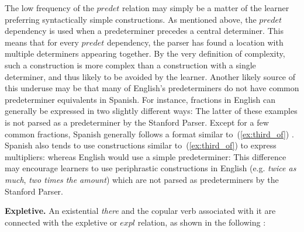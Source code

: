 \documentclass[main.tex]{subfiles}
\begin{document}
The low frequency of the $predet$ relation may simply be a matter of the learner preferring syntactically simple constructions. As mentioned above, the $predet$ dependency is used when a predeterminer precedes a central determiner. This means that for every $predet$ dependency, the parser has found a location with multiple determiners appearing together. By the very definition of complexity, such a construction is more complex than a construction with a single determiner, and thus likely to be avoided by the learner. Another likely source of this underuse may be that many of English's predeterminers do not have common predeterminer equivalents in Spanish. For instance, fractions in English can generally be expressed in two slightly different ways:
The latter of these examples is not parsed as a predeterminer by the Stanford Parser. Except for a few common fractions, Spanish generally follows a format similar to~(\ref{ex:third_of}) \citep[pp. 122-3]{butt}. Spanish also tends to use constructions similar to~(\ref{ex:third_of}) to express multipliers:
whereas English would use a simple predeterminer:
This difference may encourage learners to use periphrastic constructions in English (e.g. \textit{twice as much}, \textit{two times the amount}) which are not parsed as predeterminers by the Stanford Parser.


\textbf{Expletive.} An existential \textit{there} and the copular verb associated with it are connected with the expletive or $expl$ relation, as shown in the following \citep[pp. 126-7]{quirk:1985}: 
\newline\newline{}
\newline
\end{document}
